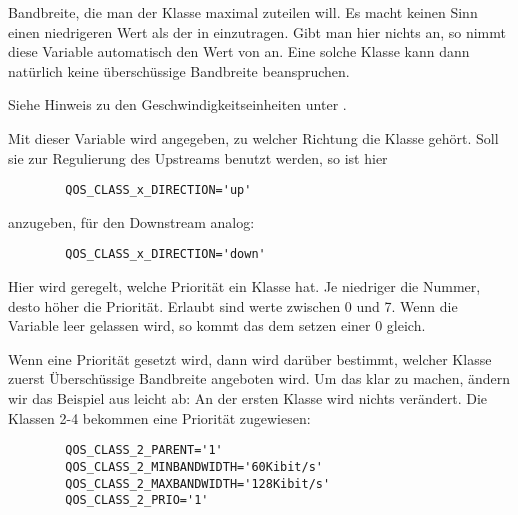 \begin{description}

   Bandbreite, die man der Klasse maximal zuteilen will. Es macht keinen
   Sinn einen niedrigeren Wert als der in 
   einzutragen. Gibt man hier nichts an, so nimmt diese Variable
   automatisch den Wert von  an. Eine solche
   Klasse kann dann natürlich keine überschüssige Bandbreite
   beanspruchen.

   Siehe Hinweis zu den Geschwindigkeitseinheiten unter .



   Mit dieser Variable wird angegeben, zu welcher Richtung die Klasse
   gehört. Soll sie zur Regulierung des Upstreams benutzt werden, so ist
   hier

\begin{example}
\begin{verbatim}
        QOS_CLASS_x_DIRECTION='up'
\end{verbatim}
\end{example}

   anzugeben, für den Downstream analog:

\begin{example}
\begin{verbatim}
        QOS_CLASS_x_DIRECTION='down'
\end{verbatim}
\end{example}



   Hier wird geregelt, welche Priorität ein Klasse hat. Je niedriger die
   Nummer, desto höher die Priorität. Erlaubt sind werte zwischen 0 und
   7. Wenn die Variable leer gelassen wird, so kommt das dem setzen einer
   0 gleich.

   Wenn eine Priorität gesetzt wird, dann wird darüber bestimmt, welcher
   Klasse zuerst Überschüssige Bandbreite angeboten wird. Um das klar zu
   machen, ändern wir das Beispiel aus 
   leicht ab:
   An der ersten Klasse wird nichts verändert. Die Klassen 2-4 bekommen
   eine Priorität zugewiesen:

\begin{example}
\begin{verbatim}
        QOS_CLASS_2_PARENT='1'
        QOS_CLASS_2_MINBANDWIDTH='60Kibit/s'
        QOS_CLASS_2_MAXBANDWIDTH='128Kibit/s'
        QOS_CLASS_2_PRIO='1'


\end{verbatim}
\end{example}
\end{description}
